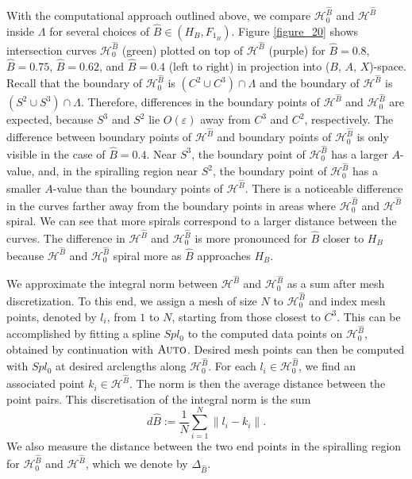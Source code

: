 \documentclass{ws-ijbc}
\begin{document}
With the computational approach outlined above, we compare $\mathscr{H}_0^{\widehat{B}}$ and $\mathscr{H}^{\widehat{B}}$ inside $\Lambda$ for several choices of $\widehat{B} \in (H_B, F_{1_B})$.  Figure \ref{figure_20} shows intersection curves $\mathscr{H}_0^{\widehat{B}}$ (green) plotted on top of $\mathscr{H}^{\widehat{B}}$ (purple) for $\widehat{B}=0.8$, $\widehat{B}=0.75$, $\widehat{B}=0.62$, and $\widehat{B}=0.4$ (left to right) in projection into ($B$, $A$, $X$)-space.  Recall that the boundary of $\mathscr{H}^{\widehat{B}}_0$ is $(C^2 \cup C^3) \cap \Lambda$ and the boundary of $\mathscr{H}^{\widehat{B}}$ is $(S^2 \cup S^3) \cap \Lambda$.  Therefore, differences in the boundary points of  $\mathscr{H}^{\widehat{B}}$ and $\mathscr{H}_0^{\widehat{B}}$ are expected, because $S^3$ and $S^2$ lie $O(\varepsilon)$ away from $C^3$ and $C^2$, respectively.  The difference between boundary points of $\mathscr{H}^{\widehat{B}}$ and boundary points of $\mathscr{H}_0^{\widehat{B}}$ is only visible in the case of $\widehat{B}=0.4$.  Near $S^3$, the boundary point of $\mathscr{H}_0^{\widehat{B}}$ has a larger $A$-value, and, in the spiralling region near $S^2$, the boundary point of $\mathscr{H}_0^{\widehat{B}}$ has a smaller $A$-value than the boundary points of $\mathscr{H}^{\widehat{B}}$.    There is a noticeable difference in the curves farther away from the boundary points in areas where $\mathscr{H}^{\widehat{B}}_0$ and $\mathscr{H}^{\widehat{B}}$ spiral.  We can see that more spirals correspond to a larger distance between the curves.  The difference in $\mathscr{H}^{\widehat{B}}$ and $\mathscr{H}_0^{\widehat{B}}$ is more pronounced for $\widehat{B}$ closer to $H_B$ because $\mathscr{H}^{\widehat{B}}$ and $\mathscr{H}_0^{\widehat{B}}$ spiral more as $\widehat{B}$ approaches $H_B$.

We approximate the integral norm between $\mathscr{H}^{\widehat{B}}$ and $\mathscr{H}_0^{\widehat{B}}$ as a sum after mesh discretization.  To this end, we assign a mesh of size $N$ to $\mathscr{H}_0^{\widehat{B}}$ and index mesh points, denoted by $l_i$, from $1$ to $N$, starting from those closest to $C^3$.  This can be accomplished by fitting a spline $Spl_0$ to the computed data points on $\mathscr{H}_0^{\widehat{B}}$, obtained by continuation with $\textsc{Auto}$.  Desired mesh points can then be computed with $Spl_0$ at desired arclengths along $\mathscr{H}_0^{\widehat{B}}$.  For each $l_i \in \mathscr{H}_0^{\widehat{B}}$, we find an associated point $k_i \in \mathscr{H}^{\widehat{B}}$.  The norm is then the average distance between the point pairs.  This discretisation of the integral norm is the sum
	\begin{equation*}
		d\widehat{B} := \frac{1}{N} \sum_{i=1}^{N} \left \lVert l_i - k_i\right \lVert.
		\label{integral_norm}
	\end{equation*}
We also measure the distance between the two end points in the spiralling region for $\mathscr{H}_0^{\widehat{B}}$ and $\mathscr{H}^{\widehat{B}}$, which we denote by $\Delta_{\widehat{B}}$.
\end{document}
